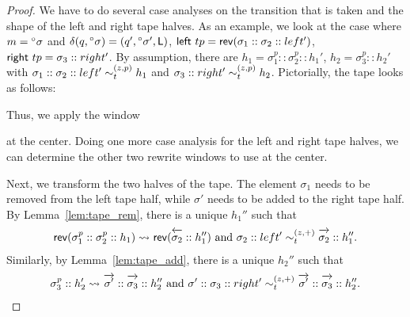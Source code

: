 \begin{proof}
  We have to do several case analyses on the transition that is taken and the shape of the left and right tape halves. As an example, we look at the case where $m = \prescript{\circ}{}\sigma$ and $\delta(q, \prescript{\circ}{}\sigma) = (q', \prescript{\circ}{}\sigma', \textsf{L})$, $\textsf{left}~tp = \mathsf{rev}{(\sigma_1 :: \sigma_2 :: left')}$, $\textsf{right}~tp = \sigma_3 :: right'$. 
  By assumption, there are $h_1 = \sigma_1^{p} :: \sigma_2^{p} :: h_1'$, $h_2 = \sigma_3^p :: h_2'$ with $\sigma_1 :: \sigma_2 :: left' \sim_t^{(z, p)} h_1$ and $\sigma_3 :: right' \sim_t^{(z, p)} h_2$. 
  Pictorially, the tape looks as follows:
  \begin{center}
  \end{center}
  Thus, we apply the window 
  \begin{center}
  \end{center}
  at the center.
  Doing one more case analysis for the left and right tape halves, we can determine the other two rewrite windows to use at the center.

  Next, we transform the two halves of the tape. The element $\sigma_1$ needs to be removed from the left tape half, while $\sigma'$ needs to be added to the right tape half. 
  By Lemma~\ref{lem:tape_rem}, there is a unique $h_1''$ such that 
  \begin{align*}
    \rev{(\sigma_1^p :: \sigma_2^p :: h_1)} \strent{} \rev{(\polneg{\sigma_2} :: h_1'')} \text{ and } \sigma_2 :: left' \reprtt{z}{+} \polpos{\sigma_2} :: h_1''. 
  \end{align*}
  Similarly, by Lemma~\ref{lem:tape_add}, there is a unique $h_2''$ such that
  \begin{align*}
    \sigma_3^p :: h_2' \strent{} \polpos{\sigma'} :: \polpos{\sigma_3} :: h_2'' \text{ and } \sigma' :: \sigma_3 :: right' \reprtt{z}{+} \polpos{\sigma'} :: \polpos{\sigma_3} :: h_2''. 
  \end{align*}


\end{proof}
